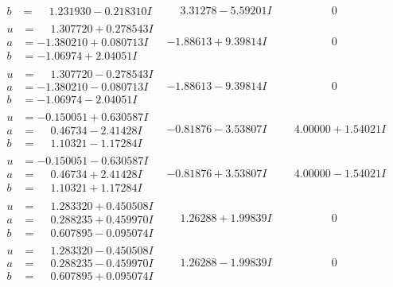 \documentclass[1p]{elsarticle_modified}
\theoremstyle{definition}
\begin{document}
$$\begin{array}{c|c|c}
\begin{aligned}
b &= \phantom{-}1.231930 - 0.218310 I\end{aligned}
 & \phantom{-}3.31278 - 5.59201 I & \phantom{-0.000000 } 0 \\ \hline\begin{aligned}
u &= \phantom{-}1.307720 + 0.278543 I \\
a &= -1.380210 + 0.080713 I \\
b &= -1.06974 + 2.04051 I\end{aligned}
 & -1.88613 + 9.39814 I & \phantom{-0.000000 } 0 \\ \hline\begin{aligned}
u &= \phantom{-}1.307720 - 0.278543 I \\
a &= -1.380210 - 0.080713 I \\
b &= -1.06974 - 2.04051 I\end{aligned}
 & -1.88613 - 9.39814 I & \phantom{-0.000000 } 0 \\ \hline\begin{aligned}
u &= -0.150051 + 0.630587 I \\
a &= \phantom{-}0.46734 - 2.41428 I \\
b &= \phantom{-}1.10321 - 1.17284 I\end{aligned}
 & -0.81876 - 3.53807 I & \phantom{-}4.00000 + 1.54021 I \\ \hline\begin{aligned}
u &= -0.150051 - 0.630587 I \\
a &= \phantom{-}0.46734 + 2.41428 I \\
b &= \phantom{-}1.10321 + 1.17284 I\end{aligned}
 & -0.81876 + 3.53807 I & \phantom{-}4.00000 - 1.54021 I \\ \hline\begin{aligned}
u &= \phantom{-}1.283320 + 0.450508 I \\
a &= \phantom{-}0.288235 + 0.459970 I \\
b &= \phantom{-}0.607895 - 0.095074 I\end{aligned}
 & \phantom{-}1.26288 + 1.99839 I & \phantom{-0.000000 } 0 \\ \hline\begin{aligned}
u &= \phantom{-}1.283320 - 0.450508 I \\
a &= \phantom{-}0.288235 - 0.459970 I \\
b &= \phantom{-}0.607895 + 0.095074 I\end{aligned}
 & \phantom{-}1.26288 - 1.99839 I & \phantom{-0.000000 } 0 \\ \hline\begin{aligned}

\end{aligned}
\end{array}$$
\end{document}
